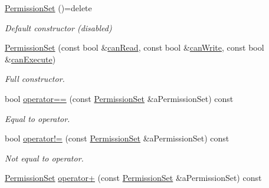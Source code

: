 \begin{DoxyCompactItemize}
\item 
\mbox{\label{classlibrary_1_1core_1_1fs_1_1_permission_set_a8a6eb39cc2a8bca92a657d065d3e36ba}} 
\hyperlink{classlibrary_1_1core_1_1fs_1_1_permission_set_a8a6eb39cc2a8bca92a657d065d3e36ba}{Permission\+Set} ()=delete
\begin{DoxyCompactList}\small\item\em Default constructor (disabled) \end{DoxyCompactList}\item 
\hyperlink{classlibrary_1_1core_1_1fs_1_1_permission_set_a39ee30a6f35f325c1cd7bcd307ab11aa}{Permission\+Set} (const bool \&\hyperlink{classlibrary_1_1core_1_1fs_1_1_permission_set_af31f6c5e1bd75102749648fd41882beb}{can\+Read}, const bool \&\hyperlink{classlibrary_1_1core_1_1fs_1_1_permission_set_a12851523996c6c4414749ee9c2f3bbd2}{can\+Write}, const bool \&\hyperlink{classlibrary_1_1core_1_1fs_1_1_permission_set_a40da22aa91ee4c8963c1c5434dd8486c}{can\+Execute})
\begin{DoxyCompactList}\small\item\em Full constructor. \end{DoxyCompactList}\item 
bool \hyperlink{classlibrary_1_1core_1_1fs_1_1_permission_set_a5233d51751bf61d545a283ee6767af47}{operator==} (const \hyperlink{classlibrary_1_1core_1_1fs_1_1_permission_set}{Permission\+Set} \&a\+Permission\+Set) const
\begin{DoxyCompactList}\small\item\em Equal to operator. \end{DoxyCompactList}\item 
bool \hyperlink{classlibrary_1_1core_1_1fs_1_1_permission_set_a7549184997b592bb790ccad3e9084a19}{operator!=} (const \hyperlink{classlibrary_1_1core_1_1fs_1_1_permission_set}{Permission\+Set} \&a\+Permission\+Set) const
\begin{DoxyCompactList}\small\item\em Not equal to operator. \end{DoxyCompactList}\item 
\hyperlink{classlibrary_1_1core_1_1fs_1_1_permission_set}{Permission\+Set} \hyperlink{classlibrary_1_1core_1_1fs_1_1_permission_set_ade354e83f2e281f9a870e73479cfa83a}{operator+} (const \hyperlink{classlibrary_1_1core_1_1fs_1_1_permission_set}{Permission\+Set} \&a\+Permission\+Set) const

\end{DoxyCompactItemize}
